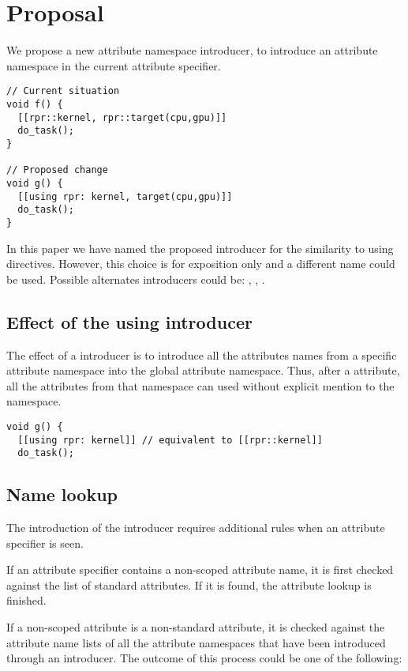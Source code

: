 \section{Proposal}

We propose a new attribute namespace introducer, to introduce an attribute
namespace in the current attribute specifier.

\begin{lstlisting}
// Current situation
void f() {
  [[rpr::kernel, rpr::target(cpu,gpu)]]
  do_task();
}

// Proposed change
void g() {
  [[using rpr: kernel, target(cpu,gpu)]]
  do_task();
}
\end{lstlisting}

In this paper we have named the proposed introducer  for the similarity to using directives. However,
this choice is for exposition only and a different name could be used. Possible alternates introducers could be:
,
,
.

\subsection{Effect of the using introducer}

The effect of a  introducer is to introduce all the attributes
names from a specific attribute namespace into the global attribute namespace.
Thus, after a  attribute, all the attributes from that namespace
can used without explicit mention to the namespace.

\begin{lstlisting}
void g() {
  [[using rpr: kernel]] // equivalent to [[rpr::kernel]]
  do_task();
\end{lstlisting}

\subsection{Name lookup}

The introduction of the  introducer requires additional
rules when an attribute specifier is seen. 

If an attribute specifier contains a non-scoped attribute name, it is
first checked against the list of standard attributes. If it is found,
the attribute lookup is finished.

If a non-scoped attribute is a non-standard attribute, it is checked
against the attribute name lists of all the attribute namespaces that have been
introduced through an  introducer. The outcome of this process
could be one of the following:

